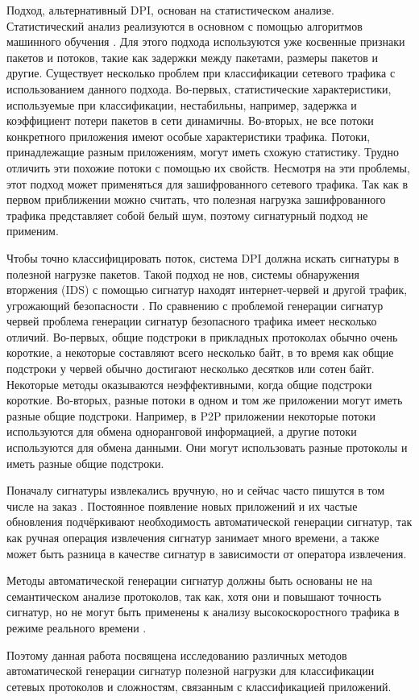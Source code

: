 Подход, альтернативный DPI, основан на статистическом анализе.
Статистический анализ реализуются в основном с помощью алгоритмов машинного обучения \cite{erman2006qrp05}.
Для этого подхода используются уже косвенные признаки пакетов и потоков, такие как задержки между пакетами, размеры пакетов и другие.
Существует несколько проблем при классификации сетевого трафика с использованием данного подхода.
Во-первых, статистические характеристики, используемые при классификации, нестабильны, например, задержка и
коэффициент потери пакетов в сети динамичны.
Во-вторых, не все потоки конкретного приложения имеют особые характеристики трафика.
Потоки, принадлежащие разным приложениям, могут иметь схожую статистику. Трудно отличить эти похожие потоки с помощью их свойств.
Несмотря на эти проблемы, этот подход может применяться для зашифрованного сетевого трафика.
Так как в первом приближении можно считать, что полезная нагрузка зашифрованного трафика представляет собой белый шум,
поэтому сигнатурный подход не применим.

Чтобы точно классифицировать поток, система DPI должна искать сигнатуры в полезной нагрузке пакетов.
Такой подход не нов, системы обнаружения вторжения (IDS) с помощью сигнатур находят интернет-червей и другой трафик, угрожающий безопасности
\cite{singh2004automated, kim2004autograph, newsome2005polygraph}.
По сравнению с проблемой генерации сигнатур червей проблема генерации сигнатур безопасного трафика имеет несколько отличий.
Во-первых, общие подстроки в прикладных протоколах обычно очень короткие, а некоторые составляют всего несколько байт,
в то время как общие подстроки у червей обычно достигают несколько десятков или сотен байт.
Некоторые методы \cite{singh2004automated, kim2004autograph} оказываются неэффективными, когда общие подстроки короткие.
Во-вторых, разные потоки в одном и том же приложении могут иметь разные общие подстроки.
Например, в P2P приложении некоторые потоки используются для обмена одноранговой информацией,
а другие потоки используются для обмена данными. Они могут использовать разные протоколы и иметь разные общие подстроки.

Поначалу сигнатуры извлекались вручную, но и сейчас часто пишутся в том числе на заказ \cite{amonitoring}.
Постоянное появление новых приложений и их частые обновления подчёркивают необходимость автоматической генерации сигнатур,
так как ручная операция извлечения сигнатур занимает много времени, а также может быть разница в качестве сигнатур
в зависимости от оператора извлечения.

Методы автоматической генерации сигнатур должны быть основаны не на семантическом анализе протоколов, так как,
хотя они и повышают точность сигнатур, но не могут быть применены
к анализу высокоскоростного трафика в режиме реального времени \cite{park2008towards}.

Поэтому данная работа посвящена исследованию различных методов автоматической генерации сигнатур полезной нагрузки
для классификации сетевых протоколов и сложностям, связанным с классификацией приложений.

\newpage
